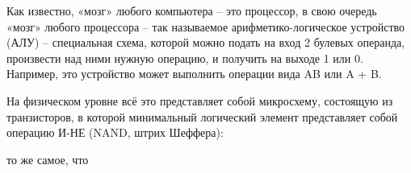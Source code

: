 \question
Как известно, «мозг» любого компьютера – это процессор, в свою очередь «мозг» любого процессора – так называемое арифметико-логическое устройство (АЛУ) – специальная схема, которой можно подать на вход 2 булевых операнда, произвести над ними нужную операцию, и получить на выходе 1 или 0. Например, это устройство может выполнить операции вида AB или A + B.

На физическом уровне всё это представляет собой микросхему, состоящую из транзисторов, в которой минимальный логический элемент представляет собой операцию И-НЕ (NAND, штрих Шеффера):

\begin{figure}[h]

\begin{minipage}[h]{0.55\linewidth}
\end{minipage}
\begin{minipage}[h]{0.45\linewidth}
\end{minipage}
\end{figure}

то же самое, что

\begin{figure}[h]

\begin{minipage}[h]{0.55\linewidth}
\end{minipage}
\begin{minipage}[h]{0.45\linewidth}
\end{minipage}
\end{figure}


